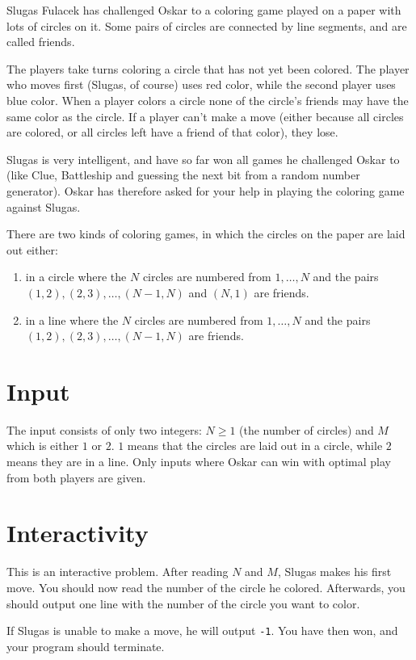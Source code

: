 Slugas Fulacek has challenged Oskar to a coloring game played on a paper with lots of circles on it.
Some pairs of circles are connected by line segments, and are called friends.

The players take turns coloring a circle that has not yet been colored.
The player who moves first (Slugas, of course) uses red color, while the second player uses blue color.
When a player colors a circle none of the circle's friends may have the same color as the circle.
If a player can't make a move (either because all circles are colored, or all circles left have a friend of that color), they lose.

Slugas is very intelligent, and have so far won all games he challenged Oskar to (like Clue, Battleship and guessing the next bit from a random number generator).
Oskar has therefore asked for your help in playing the coloring game against Slugas.

There are two kinds of coloring games, in which the circles on the paper are laid out either:
\begin{enumerate}
    \item in a circle where the $N$ circles are numbered from $1, \dots, N$ and the pairs $(1, 2), (2, 3), \dots, (N-1, N)$ and $(N, 1)$ are friends.
    \item in a line where the $N$ circles are numbered from $1, \dots, N$ and the pairs $(1, 2), (2, 3), \dots, (N-1, N)$ are friends.
\end{enumerate}

\section*{Input}
The input consists of only two integers: $N \ge 1$ (the number of circles) and $M$ which is either $1$ or $2$.
$1$ means that the circles are laid out in a circle, while $2$ means they are in a line.
Only inputs where Oskar can win with optimal play from both players are given.

\section*{Interactivity}
This is an interactive problem.
After reading $N$ and $M$, Slugas makes his first move.
You should now read the number of the circle he colored.
Afterwards, you should output one line with the number of the circle you want to color.

If Slugas is unable to make a move, he will output \texttt{-1}.
You have then won, and your program should terminate.

